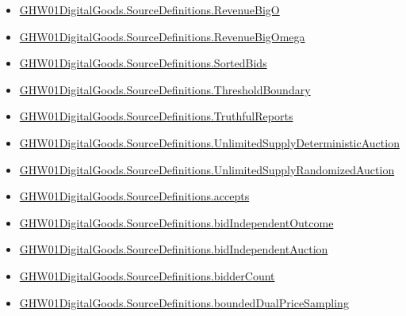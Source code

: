 \documentclass[10pt]{article}
\begin{document}
\begin{itemize}[leftmargin=1.2em]
\begin{itemize}[leftmargin=1.2em]
\item \hyperlink{paper-prerequisite-7b02108dc9d62362}{GHW01\allowbreak{}Digital\allowbreak{}Goods.\allowbreak{}Source\allowbreak{}Definitions.\allowbreak{}Revenue\allowbreak{}Big\allowbreak{}O}
\item \hyperlink{paper-prerequisite-2d7871ce535b6653}{GHW01\allowbreak{}Digital\allowbreak{}Goods.\allowbreak{}Source\allowbreak{}Definitions.\allowbreak{}Revenue\allowbreak{}Big\allowbreak{}Omega}
\item \hyperlink{paper-prerequisite-1fedc4ae963ce9a4}{GHW01\allowbreak{}Digital\allowbreak{}Goods.\allowbreak{}Source\allowbreak{}Definitions.\allowbreak{}Sorted\allowbreak{}Bids}
\item \hyperlink{paper-prerequisite-4178ea3b672e0864}{GHW01\allowbreak{}Digital\allowbreak{}Goods.\allowbreak{}Source\allowbreak{}Definitions.\allowbreak{}Threshold\allowbreak{}Boundary}
\item \hyperlink{paper-prerequisite-824a2544644d033f}{GHW01\allowbreak{}Digital\allowbreak{}Goods.\allowbreak{}Source\allowbreak{}Definitions.\allowbreak{}Truthful\allowbreak{}Reports}
\item \hyperlink{paper-prerequisite-113f313b6c6d26ce}{GHW01\allowbreak{}Digital\allowbreak{}Goods.\allowbreak{}Source\allowbreak{}Definitions.\allowbreak{}Unlimited\allowbreak{}Supply\allowbreak{}Deterministic\allowbreak{}Auction}
\item \hyperlink{paper-prerequisite-34fbae4bd485e4c8}{GHW01\allowbreak{}Digital\allowbreak{}Goods.\allowbreak{}Source\allowbreak{}Definitions.\allowbreak{}Unlimited\allowbreak{}Supply\allowbreak{}Randomized\allowbreak{}Auction}
\item \hyperlink{paper-prerequisite-416a6a5daee58bf1}{GHW01\allowbreak{}Digital\allowbreak{}Goods.\allowbreak{}Source\allowbreak{}Definitions.\allowbreak{}accepts}
\item \hyperlink{paper-prerequisite-f264be8ad03938a6}{GHW01\allowbreak{}Digital\allowbreak{}Goods.\allowbreak{}Source\allowbreak{}Definitions.\allowbreak{}bid\allowbreak{}Independent\allowbreak{}Outcome}
\item \hyperlink{paper-prerequisite-a41c292da0e8caba}{GHW01\allowbreak{}Digital\allowbreak{}Goods.\allowbreak{}Source\allowbreak{}Definitions.\allowbreak{}bid\allowbreak{}Independent\allowbreak{}Auction}
\item \hyperlink{paper-prerequisite-68fd05f498eb2305}{GHW01\allowbreak{}Digital\allowbreak{}Goods.\allowbreak{}Source\allowbreak{}Definitions.\allowbreak{}bidder\allowbreak{}Count}
\item \hyperlink{paper-prerequisite-75e5f2af0e2f1694}{GHW01\allowbreak{}Digital\allowbreak{}Goods.\allowbreak{}Source\allowbreak{}Definitions.\allowbreak{}bounded\allowbreak{}Dual\allowbreak{}Price\allowbreak{}Sampling}

\end{itemize}
\end{itemize}
\end{document}
